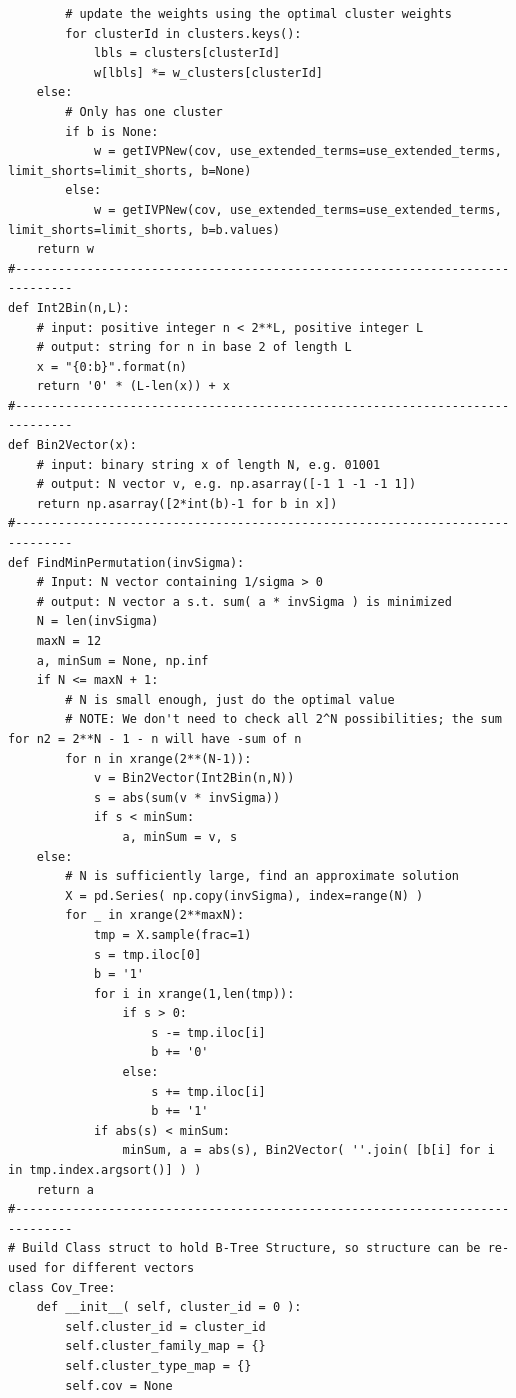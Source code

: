 \documentclass[10pt,twoside,titlepage]{article}   %
\begin{document}
\begin{lstlisting}
        # update the weights using the optimal cluster weights
        for clusterId in clusters.keys():
            lbls = clusters[clusterId]
            w[lbls] *= w_clusters[clusterId]
    else:
        # Only has one cluster
        if b is None:
            w = getIVPNew(cov, use_extended_terms=use_extended_terms, limit_shorts=limit_shorts, b=None)
        else:
            w = getIVPNew(cov, use_extended_terms=use_extended_terms, limit_shorts=limit_shorts, b=b.values)
    return w
#------------------------------------------------------------------------------
def Int2Bin(n,L):
    # input: positive integer n < 2**L, positive integer L
    # output: string for n in base 2 of length L
    x = "{0:b}".format(n)
    return '0' * (L-len(x)) + x
#------------------------------------------------------------------------------
def Bin2Vector(x):
    # input: binary string x of length N, e.g. 01001
    # output: N vector v, e.g. np.asarray([-1 1 -1 -1 1])
    return np.asarray([2*int(b)-1 for b in x])
#------------------------------------------------------------------------------
def FindMinPermutation(invSigma):
    # Input: N vector containing 1/sigma > 0
    # output: N vector a s.t. sum( a * invSigma ) is minimized
    N = len(invSigma)
    maxN = 12
    a, minSum = None, np.inf
    if N <= maxN + 1:
        # N is small enough, just do the optimal value
        # NOTE: We don't need to check all 2^N possibilities; the sum for n2 = 2**N - 1 - n will have -sum of n
        for n in xrange(2**(N-1)):
            v = Bin2Vector(Int2Bin(n,N))
            s = abs(sum(v * invSigma))
            if s < minSum:
                a, minSum = v, s
    else:
        # N is sufficiently large, find an approximate solution
        X = pd.Series( np.copy(invSigma), index=range(N) )
        for _ in xrange(2**maxN):
            tmp = X.sample(frac=1)
            s = tmp.iloc[0]
            b = '1'
            for i in xrange(1,len(tmp)):
                if s > 0:
                    s -= tmp.iloc[i]
                    b += '0'
                else:
                    s += tmp.iloc[i]
                    b += '1'
            if abs(s) < minSum:
                minSum, a = abs(s), Bin2Vector( ''.join( [b[i] for i in tmp.index.argsort()] ) )
    return a
#------------------------------------------------------------------------------
# Build Class struct to hold B-Tree Structure, so structure can be re-used for different vectors
class Cov_Tree:
    def __init__( self, cluster_id = 0 ):
        self.cluster_id = cluster_id
        self.cluster_family_map = {}
        self.cluster_type_map = {}
        self.cov = None


\end{lstlisting}
\end{document}
